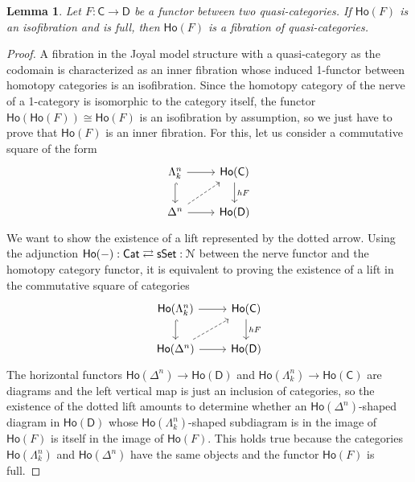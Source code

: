 \documentclass[a4paper,12pt]{amsart}
\newcommand{\ho}[1]{\mathsf{Ho}(#1)}
\renewcommand{\mathcal}{\EuScript}
\theoremstyle{plain}
\newtheorem{lemma}[theorem]{Lemma}%
\theoremstyle{definition}
\theoremstyle{remark}
\begin{document}
\begin{lemma}\label{lemma:nerveofhF}
Let $F:\mathsf{C}\rightarrow\mathsf{D}$ be a functor between two quasi-categories. If $\ho{F}$ is an isofibration and is full, then $\ho{F}$ is a fibration of quasi-categories.
\end{lemma}
\begin{proof}
A fibration in the Joyal model structure with a quasi-category as the codomain is characterized as an inner fibration whose induced 1-functor between homotopy categories is an isofibration. Since the homotopy category of the nerve of a 1-category is isomorphic to the category itself, the functor $\ho{\ho{F}}\cong \ho F$ is an isofibration by assumption, so we just have to prove that $\ho{F}$ is an inner fibration. For this, let us consider a commutative square of the form
\[
\begin{tikzcd}
\Lambda^n_k 
  \arrow[d, hook] 
  \arrow[r] 
& \ho{\mathsf{C}}
  \arrow[d, "hF"] \\
\Delta^n 
  \arrow[r] 
  \arrow[ur, dashed] 
& \ho{\mathsf{D}}
\end{tikzcd}
\]
We want to show the existence of a lift represented by the dotted arrow. Using the adjunction $\ho{-}: \mathsf{Cat} \rightleftarrows \mathsf{sSet}: \mathcal{N}$ between the nerve functor and the homotopy category functor, it is equivalent to proving the existence of a lift in the commutative square of categories
\[
\begin{tikzcd}
\ho{\Lambda^n_k}
  \arrow[d, hook] 
  \arrow[r] 
&\ho{\mathsf{C}} 
  \arrow[d, "hF"] \\
\ho{\Delta^n} 
  \arrow[r] 
  \arrow[ur, dashed] 
&\ho{\mathsf{D}}
\end{tikzcd}
\]
The horizontal functors $\ho{\Delta^n} \longrightarrow \ho{\mathsf{D}}$ and $\ho{\Lambda^n_k} \longrightarrow \ho{\mathsf{C}}$ are diagrams and the left vertical map is just an inclusion of categories, so the existence of the dotted lift amounts to determine whether an $\ho{\Delta^n}$-shaped diagram in $\ho{\mathsf{D}}$ whose $\ho{\Lambda^n_k}$-shaped subdiagram is in the image of $\ho{F}$ is itself in the image of $\ho{F}$. This holds true because the categories $\ho{\Lambda^n_k}$ and $\ho{\Delta^n}$ have the same objects and the functor $\ho{F}$ is full.
\end{proof}
\end{document}
